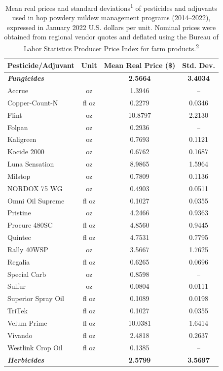 \documentclass[10pt,a4paper]{article}
\begin{document}
\newpage
\begin{table}[ht]
\centering
\caption{Mean real prices and standard deviations\textsuperscript{1} of pesticides and adjuvants used in hop powdery mildew management programs (2014--2022), expressed in January 2022 U.S. dollars per unit. Nominal prices were obtained from regional vendor quotes and deflated using the Bureau of Labor Statistics Producer Price Index for farm products.\textsuperscript{2}}
\label{tab:S2_pesticides}
\footnotesize
\setlength{\tabcolsep}{4pt}
\begin{tabular}{lccc}
\hline
\textbf{Pesticide/Adjuvant} & \textbf{Unit} & \textbf{Mean Real Price (\$)} & \textbf{Std. Dev.} \\
\hline
\textbf{\textit{Fungicides}} & & \textbf{2.5664} & \textbf{3.4034} \\
\hline
Accrue & oz & 1.3946 & -- \\
Copper-Count-N & fl oz & 0.2279 & 0.0346 \\
Flint & oz & 10.8797 & 2.2130 \\
Folpan & oz & 0.2936 & -- \\
Kaligreen & oz & 0.7693 & 0.1121 \\
Kocide 2000 & oz & 0.6762 & 0.1687 \\
Luna Sensation & oz & 8.9865 & 1.5964 \\
Milstop & oz & 0.7809 & 0.1136 \\
NORDOX 75 WG & oz & 0.4903 & 0.0511 \\
Omni Oil Supreme & fl oz & 0.1027 & 0.0355 \\
Pristine & oz & 4.2466 & 0.9363 \\
Procure 480SC & fl oz & 4.8560 & 0.9445 \\
Quintec & fl oz & 4.7531 & 0.7795 \\
Rally 40WSP & oz & 3.5667 & 1.7625 \\
Regalia & fl oz & 0.6265 & 0.0696 \\
Special Carb & oz & 0.8598 & -- \\
Sulfur & oz & 0.0804 & 0.0111 \\
Superior Spray Oil & fl oz & 0.1089 & 0.0198 \\
TriTek & fl oz & 0.1027 & 0.0355 \\
Velum Prime & fl oz & 10.0381 & 1.6414 \\
Vivando & fl oz & 2.4818 & 0.2637 \\
Westlink Crop Oil & fl oz & 0.1385 & -- \\
\hline
\textbf{\textit{Herbicides}} & & \textbf{2.5799} & \textbf{3.5697} \\

\end{tabular}
\end{table}
\end{document}
